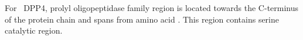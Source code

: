 For~ DPP4, prolyl oligopeptidase family region is located towards the C-terminus of the protein chain and spans from amino acid . This region contains serine catalytic region.  